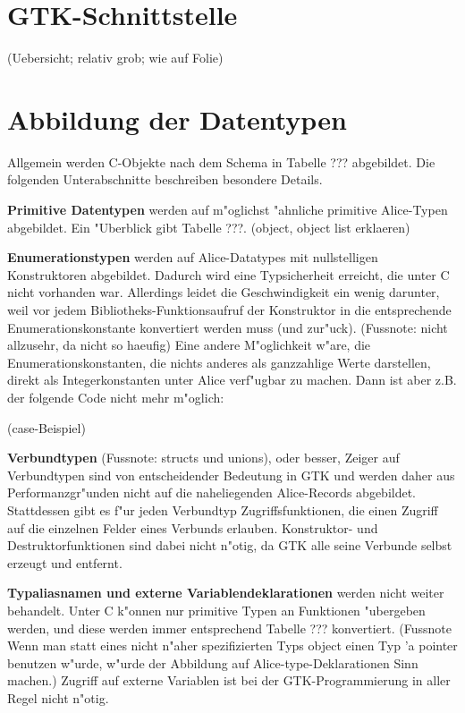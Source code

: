 \documentclass{article}
\begin{document}
\section{GTK-Schnittstelle}

(Uebersicht; relativ grob; wie auf Folie)

\section{Abbildung der Datentypen}

Allgemein werden C-Objekte nach dem Schema in Tabelle ??? abgebildet.
Die folgenden Unterabschnitte beschreiben besondere Details. 

\textbf{Primitive Datentypen} werden auf m"oglichst "ahnliche primitive
Alice-Typen abgebildet. Ein "Uberblick gibt Tabelle ???.
(object, object list erklaeren)

\textbf{Enumerationstypen} werden auf Alice-Datatypes mit nullstelligen
Konstruktoren abgebildet. Dadurch wird eine Typsicherheit erreicht, die
unter C nicht vorhanden war. Allerdings leidet die Geschwindigkeit ein
wenig darunter, weil vor jedem Bibliotheks-Funktionsaufruf der Konstruktor
in die entsprechende Enumerationskonstante konvertiert werden muss
(und zur"uck). (Fussnote: nicht allzusehr, da nicht so haeufig)
Eine andere M"oglichkeit w"are, die Enumerationskonstanten,
die nichts anderes als ganzzahlige Werte darstellen, direkt als
Integerkonstanten unter Alice verf"ugbar zu machen. Dann ist aber z.B.
der folgende Code nicht mehr m"oglich:

(case-Beispiel)

\textbf{Verbundtypen} (Fussnote: structs und unions), oder besser,
Zeiger auf Verbundtypen sind von entscheidender
Bedeutung in GTK und werden daher aus Performanzgr"unden nicht auf die
naheliegenden Alice-Records abgebildet.
Stattdessen gibt es f"ur jeden Verbundtyp Zugriffsfunktionen,
die einen Zugriff auf die einzelnen Felder eines Verbunds erlauben.
Konstruktor- und Destruktorfunktionen sind dabei nicht n"otig, da GTK alle
seine Verbunde selbst erzeugt und entfernt.

\textbf{Typaliasnamen und externe Variablendeklarationen} werden nicht weiter
behandelt. Unter C k"onnen nur primitive Typen an Funktionen "ubergeben werden,
und diese werden immer entsprechend Tabelle ??? konvertiert. 
(Fussnote Wenn man statt eines nicht n"aher spezifizierten Typs object 
einen Typ 'a pointer benutzen w"urde, w"urde der Abbildung auf 
Alice-type-Deklarationen Sinn machen.)
Zugriff auf externe Variablen ist bei der GTK-Programmierung in aller Regel
nicht n"otig.
\end{document}
